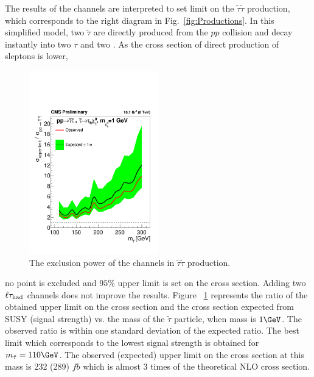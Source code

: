 The results of the \tauTau channels are interpreted to set limit on the $\tilde{\tau}\tilde{\tau}$ production, which corresponds to the right diagram in Fig.~\ref{fig:Productions}. In this simplified model, two $\tilde{\tau}$ are directly produced from the $pp$ collision and decay instantly into two $\tau$ and two \PSGczDo. As the cross section of direct production of sleptons is lower,
\begin{linenomath}
\begin{figure}[h]
\centering
\includegraphics[width=0.5\textwidth,keepaspectratio=true]{StatisticsFig/ExclusionSTauSTauLsp1.pdf}
\caption{The exclusion power of the \tauTau channels in $\tilde{\tau}\tilde{\tau}$ production.}
\label{fig:limit_stau_stau}
\end{figure}
\end{linenomath}
 no point is excluded and $95\%$ upper limit is set on the cross section. Adding two $\ell\tau_{\rm had}$ channels does not improve the results.
Figure ~\ref{fig:limit_stau_stau} represents the ratio of the 
obtained upper limit on the cross section and the cross section expected from SUSY (signal strength) vs. the mass of the $\tilde{\tau}$ particle, when \PSGczDo mass is $1 \GeV$.
The observed ratio is within one standard deviation of  the expected ratio.
The best limit which corresponds to the lowest signal strength is obtained for $m_{\tilde{\tau}}=110 \GeV$. The observed (expected) upper limit on the cross section at this mass is 232 (289) $fb$ which is almost 3 times of the theoretical NLO cross section.
